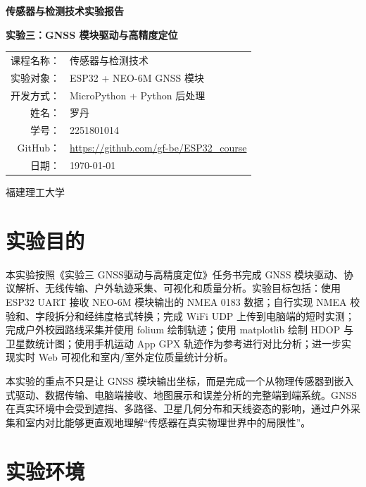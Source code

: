 \documentclass[UTF8,a4paper,12pt]{ctexart}
\begin{document}
\begin{titlepage}
\centering
\vspace*{2.2cm}
{\bfseries 传感器与检测技术实验报告\par}
\vspace{1.2cm}
{\bfseries 实验三：GNSS 模块驱动与高精度定位\par}
\vspace{2.2cm}
\begin{tabular}{rl}
课程名称：& 传感器与检测技术\\[0.6cm]
实验对象：& ESP32 + NEO-6M GNSS 模块\\[0.6cm]
开发方式：& MicroPython + Python 后处理\\[0.6cm]
姓名：& 罗丹\\[0.6cm]
学号：& 2251801014\\[0.6cm]
GitHub：& \url{https://github.com/gf-be/ESP32_course}\\[0.6cm]
日期：& \today\\
\end{tabular}
\vfill
{福建理工大学\par}
\end{titlepage}

\tableofcontents
\clearpage

\section{实验目的}
本实验按照《实验三 GNSS驱动与高精度定位》任务书完成 GNSS 模块驱动、协议解析、无线传输、户外轨迹采集、可视化和质量分析。实验目标包括：使用 ESP32 UART 接收 NEO-6M 模块输出的 NMEA 0183 数据；自行实现 NMEA 校验和、字段拆分和经纬度格式转换；完成 WiFi UDP 上传到电脑端的短时实测；完成户外校园路线采集并使用 folium 绘制轨迹；使用 matplotlib 绘制 HDOP 与卫星数统计图；使用手机运动 App GPX 轨迹作为参考进行对比分析；进一步实现实时 Web 可视化和室内/室外定位质量统计分析。

本实验的重点不只是让 GNSS 模块输出坐标，而是完成一个从物理传感器到嵌入式驱动、数据传输、电脑端接收、地图展示和误差分析的完整端到端系统。GNSS 在真实环境中会受到遮挡、多路径、卫星几何分布和天线姿态的影响，通过户外采集和室内对比能够更直观地理解“传感器在真实物理世界中的局限性”。

\section{实验环境}
\end{document}
